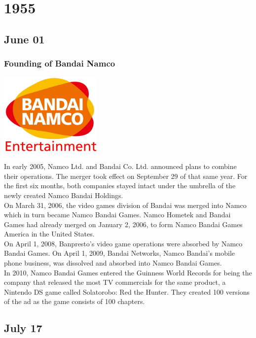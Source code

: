 \documentclass[11pt]{report}
\begin{document}
\chapter{1955}
\section{June 01}
\subsection{Founding of Bandai Namco}
\vspace{2mm}\begin{center}\includegraphics[width=5cm]{./img/bandaiNamcoLogo.jpg}\end{center}
In early 2005, Namco Ltd. and Bandai Co. Ltd. announced plans to combine their operations. The merger took effect on September 29 of that same year. For the first six months, both companies stayed intact under the umbrella of the newly created Namco Bandai Holdings.\\
\indent On March 31, 2006, the video games division of Bandai was merged into Namco which in turn became Namco Bandai Games. Namco Hometek and Bandai Games had already merged on January 2, 2006, to form Namco Bandai Games America in the United States.\\
\indent On April 1, 2008, Banpresto's video game operations were absorbed by Namco Bandai Games. On April 1, 2009, Bandai Networks, Namco Bandai's mobile phone business, was dissolved and absorbed into Namco Bandai Games.\\
\indent In 2010, Namco Bandai Games entered the Guinness World Records for being the company that released the most TV commercials for the same product, a Nintendo DS game called Solatorobo: Red the Hunter. They created 100 versions of the ad as the game consists of 100 chapters.
\section{July 17}
\end{document}
